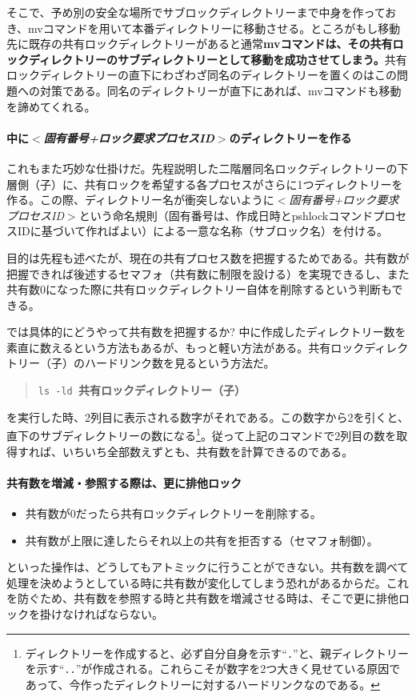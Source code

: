 そこで、予め別の安全な場所でサブロックディレクトリーまで中身を作っておき、mvコマンドを用いて本番ディレクトリーに移動させる。ところがもし移動先に既存の共有ロックディレクトリーがあると通常\textbf{mvコマンドは、その共有ロックディレクトリーのサブディレクトリーとして移動を成功させてしまう。}共有ロックディレクトリーの直下にわざわざ同名のディレクトリーを置くのはこの問題への対策である。同名のディレクトリーが直下にあれば、mvコマンドも移動を諦めてくれる。
\paragraph{中に\textit{$<$固有番号+ロック要求プロセスID$>$}のディレクトリーを作る}
これもまた巧妙な仕掛けだ。先程説明した二階層同名ロックディレクトリーの下層側（子）に、共有ロックを希望する各プロセスがさらに1つディレクトリーを作る。この際、ディレクトリー名が衝突しないように\textit{$<$固有番号+ロック要求プロセスID$>$}という命名規則（固有番号は、作成日時とpshlockコマンドプロセスIDに基づいて作ればよい）による一意な名称（サブロック名）を付ける。

目的は先程も述べたが、現在の共有プロセス数を把握するためである。共有数が把握できれば後述するセマフォ（共有数に制限を設ける）を実現できるし、また共有数0になった際に共有ロックディレクトリー自体を削除するという判断もできる。

では具体的にどうやって共有数を把握するか? 中に作成したディレクトリー数を素直に数えるという方法もあるが、もっと軽い方法がある。共有ロックディレクトリー（子）のハードリンク数を見るという方法だ。
\begin{quotation}
	\noindent
	\verb|ls -ld |\textbf{共有ロックディレクトリー（子）}
\end{quotation}
を実行した時、2列目に表示される数字がそれである。この数字から2を引くと、直下のサブディレクトリーの数になる\footnote{ディレクトリーを作成すると、必ず自分自身を示す``\verb|.|''と、親ディレクトリーを示す``\verb|..|''が作成される。これらこそが数字を2つ大きく見せている原因であって、今作ったディレクトリーに対するハードリンクなのである。}。従って上記のコマンドで2列目の数を取得すれば、いちいち全部数えずとも、共有数を計算できるのである。
\paragraph{共有数を増減・参照する際は、更に排他ロック}
\begin{itemize}
  \item 共有数が0だったら共有ロックディレクトリーを削除する。
  \item 共有数が上限に達したらそれ以上の共有を拒否する（セマフォ制御）。
\end{itemize}
といった操作は、どうしてもアトミックに行うことができない。共有数を調べて処理を決めようとしている時に共有数が変化してしまう恐れがあるからだ。これを防ぐため、共有数を参照する時と共有数を増減させる時は、そこで更に排他ロックを掛けなければならない。

